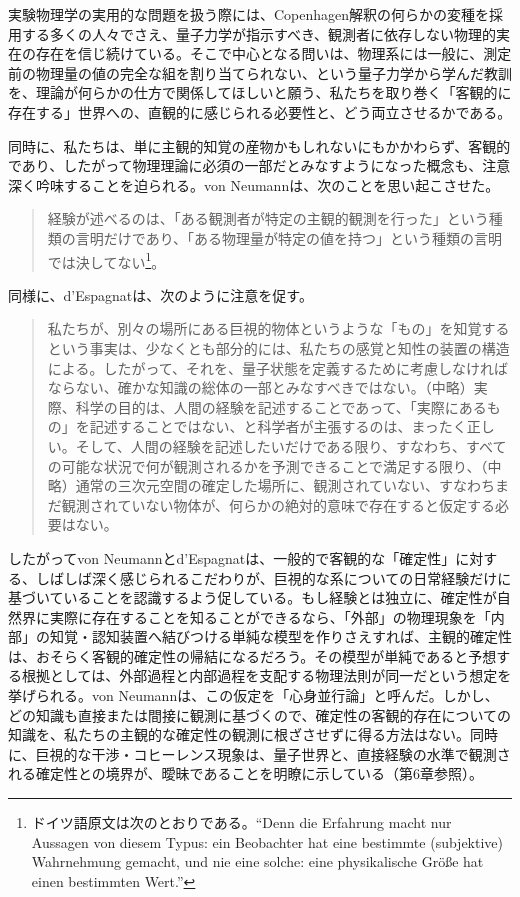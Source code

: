 実験物理学の実用的な問題を扱う際には、Copenhagen解釈の何らかの変種を採用する多くの人々でさえ、量子力学が指示すべき、観測者に依存しない物理的実在の存在を信じ続けている。そこで中心となる問いは、物理系には一般に、測定前の物理量の値の完全な組を割り当てられない、という量子力学から学んだ教訓を、理論が何らかの仕方で関係してほしいと願う、私たちを取り巻く「客観的に存在する」世界への、直観的に感じられる必要性と、どう両立させるかである。

同時に、私たちは、単に主観的知覚の産物かもしれないにもかかわらず、客観的であり、したがって物理理論に必須の一部だとみなすようになった概念も、注意深く吟味することを迫られる。von Neumann\cite[第VI章]{ref060}は、次のことを思い起こさせた。
\begin{quote}
経験が述べるのは、「ある観測者が特定の主観的観測を行った」という種類の言明だけであり、「ある物理量が特定の値を持つ」という種類の言明では決してない\footnote{ドイツ語原文は次のとおりである。``Denn die Erfahrung macht nur Aussagen von diesem Typus: ein Beobachter hat eine bestimmte (subjektive) Wahrnehmung gemacht, und nie eine solche: eine physikalische Größe hat einen bestimmten Wert.''}。
\end{quote}
同様に、d'Espagnat\cite[134--135頁]{ref496}は、次のように注意を促す。
\begin{quote}
私たちが、別々の場所にある巨視的物体というような「もの」を知覚するという事実は、少なくとも部分的には、私たちの感覚と知性の装置の構造による。したがって、それを、量子状態を定義するために考慮しなければならない、確かな知識の総体の一部とみなすべきではない。（中略）実際、科学の目的は、人間の経験を記述することであって、「実際にあるもの」を記述することではない、と科学者が主張するのは、まったく正しい。そして、人間の経験を記述したいだけである限り、すなわち、すべての可能な状況で何が観測されるかを予測できることで満足する限り、（中略）通常の三次元空間の確定した場所に、観測されていない、すなわちまだ観測されていない物体が、何らかの絶対的意味で存在すると仮定する必要はない。
\end{quote}

\hypertarget{srcpage:361}{}\label{srcpage:361}
したがってvon Neumannとd'Espagnatは、一般的で客観的な「確定性」に対する、しばしば深く感じられるこだわりが、巨視的な系についての日常経験だけに基づいていることを認識するよう促している。もし経験とは独立に、確定性が自然界に実際に存在することを知ることができるなら、「外部」の物理現象を「内部」の知覚・認知装置へ結びつける単純な模型を作りさえすれば、主観的確定性は、おそらく客観的確定性の帰結になるだろう。その模型が単純であると予想する根拠としては、外部過程と内部過程を支配する物理法則が同一だという想定を挙げられる。von Neumannは、この仮定を「心身並行論」\cite{ref060}と呼んだ。しかし、どの知識も直接または間接に観測に基づくので、確定性の客観的存在についての知識を、私たちの主観的な確定性の観測に根ざさせずに得る方法はない。同時に、巨視的な干渉・コヒーレンス現象は、量子世界と、直接経験の水準で観測される確定性との境界が、曖昧であることを明瞭に示している（第6章参照）。

